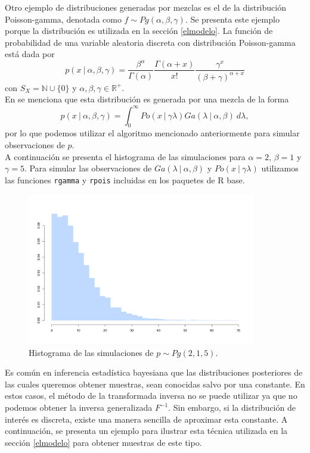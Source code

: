 \documentclass[11pt,a4paper]{article}
\begin{document}
Otro ejemplo de distribuciones generadas por mezclas es el de la distribución Poisson-gamma, denotada como $f \sim Pg(\alpha, \beta, \gamma)$. Se presenta este ejemplo porque la distribución es utilizada en la sección \ref{elmodelo}. La función de probabilidad de una variable aleatoria discreta con distribución Poisson-gamma está dada por
\begin{equation}
\label{eq:poga}
p(x \ | \ \alpha, \beta, \gamma) = \frac{\beta ^ \alpha}{\Gamma (\alpha)}\frac{\Gamma (\alpha + x)}{x!}\frac{\gamma ^ x}{(\beta + \gamma) ^ {\alpha + x}}
\end{equation}
con $S_X = \mathbb{N} \cup \lbrace 0 \rbrace$ y $\alpha, \beta, \gamma \in \mathbb{R}^+$.\\

En \citet{bernardo} se menciona que esta distribución es generada por una mezcla de la forma
$$p(x \ | \ \alpha, \beta, \gamma) = \int_0 ^\infty Po(x \ | \ \gamma \lambda) Ga(\lambda \ | \ \alpha, \beta) \ d\lambda,$$ por lo que podemos utilizar el algoritmo mencionado anteriormente para simular observaciones de $p$.\\

A continuación se presenta el histograma de las simulaciones para $\alpha = 2$, $\beta = 1$ y $\gamma = 5$. Para simular las observaciones de $Ga(\lambda \ | \ \alpha, \beta)$ y $Po(x \ | \ \gamma \lambda)$ utilizamos las funciones \texttt{rgamma} y \texttt{rpois} incluidas en los paquetes de R base.\\

\begin{figure}[H] 
\centering\includegraphics[width=10cm]{poisson_gamma.png}
\caption{Histograma de las simulaciones de $p \sim Pg(2, 1, 5)$.}
\label{fig:poga}
\end{figure}

Es común en inferencia estadística bayesiana que las distribuciones posteriores de las cuales queremos obtener muestras, sean conocidas salvo por una constante. En estos casos, el método de la transformada inversa no se puede utilizar ya que no podemos obtener la inversa generalizada $F^{-1}$. Sin embargo, si la distribución de interés es discreta, existe una manera sencilla de aproximar esta constante. A continuación, se presenta un ejemplo para ilustrar esta técnica utilizada en la sección \ref{elmodelo} para obtener muestras de este tipo.\\
\end{document}
